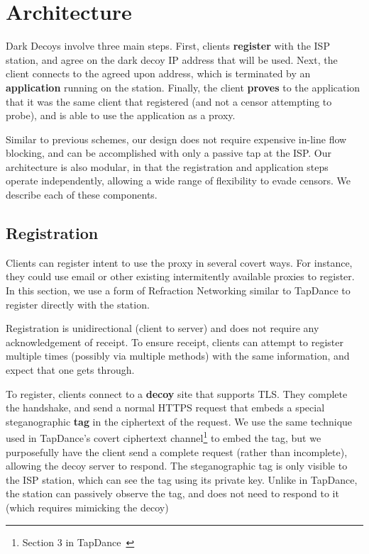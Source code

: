 \documentclass[letterpaper,twocolumn,10pt]{article}
\begin{document}


\section{Architecture}
\label{sec:architecture}

Dark Decoys involve three main steps. First, clients \textbf{register} with the
ISP station,
and agree on the dark decoy IP address that will be used. Next, the client
connects to the agreed upon address, which is terminated by an
\textbf{application} running on the station. Finally, the client \textbf{proves}
to the application that it was the same client that registered (and not a censor
attempting to probe), and is able to use the application as a proxy.

Similar to previous schemes, our design does not require expensive in-line
flow blocking, and can be accomplished with only a passive tap at the ISP.
Our architecture is also modular, in that the registration and application steps operate
independently, allowing a wide range of flexibility to evade censors. We
describe each of these components.

\subsection{Registration}

Clients can register intent to use the proxy in several covert ways. For
instance, they could use email or other existing intermitently available proxies
to register. In this section, we use a form of Refraction Networking similar to
TapDance to register directly with the station.

Registration is unidirectional (client to server) and does not require any
acknowledgement of receipt. To ensure receipt, clients can attempt to register
multiple times (possibly via multiple methods) with the same information, and expect
that one gets through.

\medskip

To register, clients connect to a \textbf{decoy} site that supports TLS. They
complete the handshake, and send a normal HTTPS request that embeds a special
steganographic \textbf{tag} in the ciphertext of the request. We use
the same technique used in TapDance's covert ciphertext channel\footnote{Section 3 in
TapDance~\cite{tapdance14}} to embed the tag, but we purposefully have the client
send a complete request (rather than incomplete), allowing the decoy server to respond.
The steganographic tag is only visible to the ISP station, which can see the tag using its
private key. Unlike in TapDance, the \scheme station can passively observe
the tag, and does not need to respond to it (which requires mimicking the
decoy)
\end{document}
